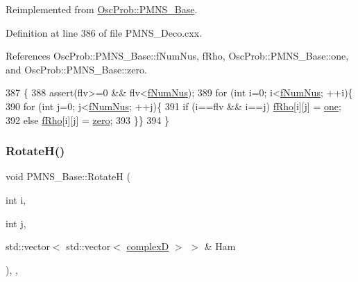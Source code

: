Reimplemented from \hyperlink{classOscProb_1_1PMNS__Base_ac0d4bf8ff1318ef96d3dafa62e0cec25}{Osc\+Prob\+::\+P\+M\+N\+S\+\_\+\+Base}.



Definition at line 386 of file P\+M\+N\+S\+\_\+\+Deco.\+cxx.



References Osc\+Prob\+::\+P\+M\+N\+S\+\_\+\+Base\+::f\+Num\+Nus, f\+Rho, Osc\+Prob\+::\+P\+M\+N\+S\+\_\+\+Base\+::one, and Osc\+Prob\+::\+P\+M\+N\+S\+\_\+\+Base\+::zero.


\begin{DoxyCode}
387 \{
388   assert(flv>=0 && flv<\hyperlink{classOscProb_1_1PMNS__Base_a24bb74bed63569dfe88b18fa6a08060e}{fNumNus});
389   \textcolor{keywordflow}{for} (\textcolor{keywordtype}{int} i=0; i<\hyperlink{classOscProb_1_1PMNS__Base_a24bb74bed63569dfe88b18fa6a08060e}{fNumNus}; ++i)\{
390   \textcolor{keywordflow}{for} (\textcolor{keywordtype}{int} j=0; j<\hyperlink{classOscProb_1_1PMNS__Base_a24bb74bed63569dfe88b18fa6a08060e}{fNumNus}; ++j)\{
391     \textcolor{keywordflow}{if} (i==flv && i==j) \hyperlink{classOscProb_1_1PMNS__Deco_a0488d62b4ef4cf5b43425769f5fcdbdf}{fRho}[i][j] = \hyperlink{classOscProb_1_1PMNS__Base_a7d1d0bbcab30a1fd8c368c40134c51ff}{one};
392     \textcolor{keywordflow}{else}                \hyperlink{classOscProb_1_1PMNS__Deco_a0488d62b4ef4cf5b43425769f5fcdbdf}{fRho}[i][j] = \hyperlink{classOscProb_1_1PMNS__Base_a05e595848c2521dc795efa7645728b94}{zero};
393   \}\}
394 \}
\end{DoxyCode}
\mbox{\label{classOscProb_1_1PMNS__Base_a6a3cf45bbe2349abf06708b65677c044}} 
\subsubsection{\texorpdfstring{Rotate\+H()}{RotateH()}}
{\footnotesize\ttfamily void P\+M\+N\+S\+\_\+\+Base\+::\+RotateH (\begin{DoxyParamCaption}\item[{int}]{i,  }\item[{int}]{j,  }\item[{std\+::vector$<$ std\+::vector$<$ \hyperlink{EigenPoint_8h_a67ca8e107e20610c3fff78d5e726ece0}{complexD} $>$ $>$ \&}]{Ham }\end{DoxyParamCaption})\hspace{0.3cm}{\ttfamily [protected]}, {\ttfamily [virtual]}, {\ttfamily [inherited]}}

